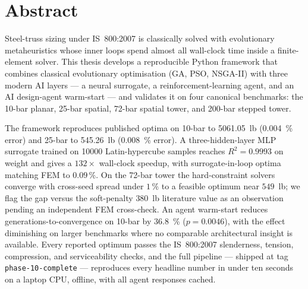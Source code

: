 \chapter*{Abstract}

Steel-truss sizing under IS~800:2007 is classically solved with
evolutionary metaheuristics whose inner loops spend almost all
wall-clock time inside a finite-element solver. This thesis develops a
reproducible Python framework that combines classical evolutionary
optimisation (GA, PSO, NSGA-II) with three modern AI layers --- a neural
surrogate, a reinforcement-learning agent, and an AI design-agent
warm-start --- and validates it on four canonical benchmarks: the
10-bar planar, 25-bar spatial, 72-bar spatial tower, and 200-bar stepped
tower.

The framework reproduces published optima on 10-bar to
\num{5061.05}~lb (\num{0.004}~\% error) and 25-bar to \num{545.26}~lb
(\num{0.008}~\% error). A three-hidden-layer MLP surrogate trained on
\num{10000} Latin-hypercube samples reaches $R^2=\num{0.9993}$ on weight
and gives a $\num{132}\times$ wall-clock speedup, with
surrogate-in-loop optima matching FEM to $\num{0.09}\,\%$. On the 72-bar
tower the hard-constraint solvers converge with cross-seed spread under
$\num{1}\,\%$ to a feasible optimum near $\num{549}$~lb; we flag the gap
versus the soft-penalty $\num{380}$~lb literature value as an observation
pending an independent FEM cross-check. An agent warm-start reduces
generations-to-convergence on 10-bar by \num{36.8}~\%
($p=\num{0.0046}$), with the effect diminishing on larger benchmarks
where no comparable architectural insight is available. Every reported
optimum passes the IS~800:2007 slenderness, tension, compression, and
serviceability checks, and the full pipeline --- shipped at tag
\texttt{phase-10-complete} --- reproduces every headline number in under
ten seconds on a laptop CPU, offline, with all agent responses cached.

\clearpage

